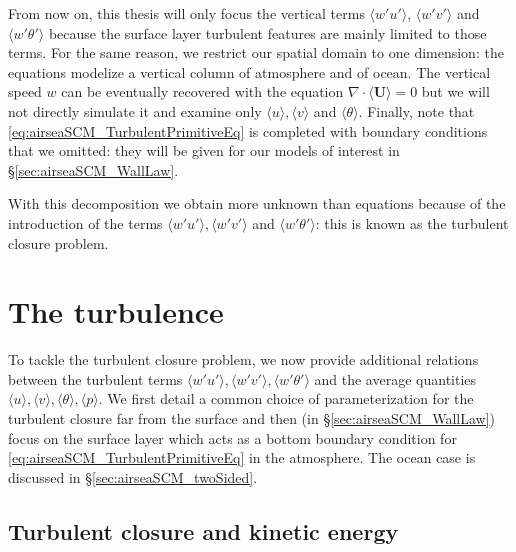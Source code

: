 From now on, this thesis will only focus the vertical terms
$\langle w' u'\rangle$, $\langle w' v'\rangle$ and
$\langle w' \theta'\rangle$
because the surface layer turbulent features are mainly limited
to those terms. For the same reason, we restrict our spatial
domain to one dimension: the equations modelize a vertical column
of atmosphere and of ocean.
The vertical speed $w$ can be eventually recovered with the
equation $\nabla \cdot \langle\mathbf{U}\rangle = 0$
but we will not directly simulate it and examine only
$\langle u \rangle, \langle v \rangle$ and $\langle \theta \rangle$.
Finally, note that \eqref{eq:airseaSCM_TurbulentPrimitiveEq}
is completed with boundary conditions that we omitted:
they will be given for our models of interest in
\S\ref{sec:airseaSCM_WallLaw}.
\par
With this decomposition we obtain more unknown than
equations because of the introduction of the terms
$\langle w' u'\rangle, \langle w' v'\rangle$
and $\langle w' \theta'\rangle$:
this is known as the turbulent closure problem.
\section{The turbulence}
\label{sec:airseaSCM_turbulence}
To tackle the turbulent closure problem,
we now provide additional relations between
the turbulent terms
$\langle w' u'\rangle, \langle w' v'\rangle,
\langle w' \theta'\rangle$ and the average quantities
$\langle u\rangle, \langle v\rangle, \langle \theta \rangle,
\langle p \rangle$.
We first detail a common choice of parameterization
for the turbulent closure far from the surface and then
(in \S\ref{sec:airseaSCM_WallLaw}) focus on the surface layer
which acts as a bottom boundary condition for
\eqref{eq:airseaSCM_TurbulentPrimitiveEq} in the atmosphere.
The ocean case is discussed in \S\ref{sec:airseaSCM_twoSided}.
\subsection{Turbulent closure and kinetic energy}
\label{sec:airseaSCM_turbulentClosure}
